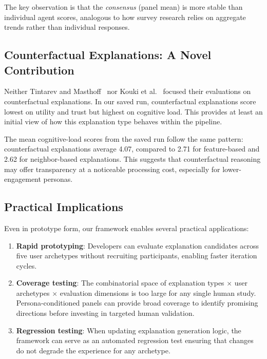 \documentclass[sigconf,nonacm]{acmart}
\begin{document}
The key observation is that the \textit{consensus} (panel mean) is more stable than individual agent scores, analogous to how survey research relies on aggregate trends rather than individual responses.

\subsection{Counterfactual Explanations: A Novel Contribution}

Neither Tintarev and Masthoff~\cite{tintarev2007survey} nor Kouki et al.~\cite{kouki2019} focused their evaluations on counterfactual explanations. In our saved run, counterfactual explanations score lowest on utility and trust but highest on cognitive load. This provides at least an initial view of how this explanation type behaves within the pipeline.

The mean cognitive-load scores from the saved run follow the same pattern: counterfactual explanations average 4.07, compared to 2.71 for feature-based and 2.62 for neighbor-based explanations. This suggests that counterfactual reasoning may offer transparency at a noticeable processing cost, especially for lower-engagement personas.

\subsection{Practical Implications}

Even in prototype form, our framework enables several practical applications:

\begin{enumerate}[leftmargin=*]
\item \textbf{Rapid prototyping}: Developers can evaluate explanation candidates across five user archetypes without recruiting participants, enabling faster iteration cycles.
\item \textbf{Coverage testing}: The combinatorial space of explanation types $\times$ user archetypes $\times$ evaluation dimensions is too large for any single human study. Persona-conditioned panels can provide broad coverage to identify promising directions before investing in targeted human validation.
\item \textbf{Regression testing}: When updating explanation generation logic, the framework can serve as an automated regression test ensuring that changes do not degrade the experience for any archetype.
\end{enumerate}
\end{document}
